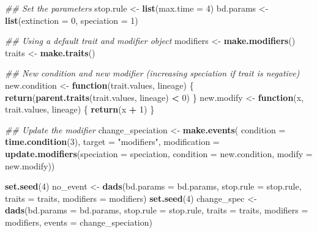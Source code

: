 \documentclass[]{book}
\newenvironment{Shaded}{\begin{snugshade}}{\end{snugshade}}
\newcommand{\CommentTok}[1]{\textcolor[rgb]{0.56,0.35,0.01}{\textit{#1}}}
\newcommand{\ControlFlowTok}[1]{\textcolor[rgb]{0.13,0.29,0.53}{\textbf{#1}}}
\newcommand{\DataTypeTok}[1]{\textcolor[rgb]{0.13,0.29,0.53}{#1}}
\newcommand{\DecValTok}[1]{\textcolor[rgb]{0.00,0.00,0.81}{#1}}
\newcommand{\KeywordTok}[1]{\textcolor[rgb]{0.13,0.29,0.53}{\textbf{#1}}}
\newcommand{\NormalTok}[1]{#1}
\newcommand{\OperatorTok}[1]{\textcolor[rgb]{0.81,0.36,0.00}{\textbf{#1}}}
\newcommand{\StringTok}[1]{\textcolor[rgb]{0.31,0.60,0.02}{#1}}
\begin{document}
\begin{Shaded}
\begin{Highlighting}[]
\CommentTok{## Set the parameters}
\NormalTok{stop.rule <-}\StringTok{ }\KeywordTok{list}\NormalTok{(}\DataTypeTok{max.time =} \DecValTok{4}\NormalTok{)}
\NormalTok{bd.params <-}\StringTok{ }\KeywordTok{list}\NormalTok{(}\DataTypeTok{extinction =} \DecValTok{0}\NormalTok{, }\DataTypeTok{speciation =} \DecValTok{1}\NormalTok{)}

\CommentTok{## Using a default trait and modifier object}
\NormalTok{modifiers <-}\StringTok{ }\KeywordTok{make.modifiers}\NormalTok{()}
\NormalTok{traits <-}\StringTok{ }\KeywordTok{make.traits}\NormalTok{()}

\CommentTok{## New condition and new modifier (increasing speciation if trait is negative)}
\NormalTok{new.condition <-}\StringTok{ }\ControlFlowTok{function}\NormalTok{(trait.values, lineage) \{}
    \KeywordTok{return}\NormalTok{(}\KeywordTok{parent.traits}\NormalTok{(trait.values, lineage) }\OperatorTok{<}\StringTok{ }\DecValTok{0}\NormalTok{)}
\NormalTok{\}}
\NormalTok{new.modify    <-}\StringTok{ }\ControlFlowTok{function}\NormalTok{(x, trait.values, lineage) \{}
  \KeywordTok{return}\NormalTok{(x }\OperatorTok{+}\StringTok{ }\DecValTok{1}\NormalTok{)}
\NormalTok{\}}

\CommentTok{## Update the modifier}
\NormalTok{change_speciation <-}\StringTok{ }\KeywordTok{make.events}\NormalTok{(}
    \DataTypeTok{condition    =} \KeywordTok{time.condition}\NormalTok{(}\DecValTok{3}\NormalTok{),}
    \DataTypeTok{target       =} \StringTok{"modifiers"}\NormalTok{,}
    \DataTypeTok{modification =} \KeywordTok{update.modifiers}\NormalTok{(}\DataTypeTok{speciation =}\NormalTok{ speciation,}
                                    \DataTypeTok{condition  =}\NormalTok{ new.condition,}
                                    \DataTypeTok{modify     =}\NormalTok{ new.modify))}

\KeywordTok{set.seed}\NormalTok{(}\DecValTok{4}\NormalTok{)}
\NormalTok{no_event <-}\StringTok{ }\KeywordTok{dads}\NormalTok{(}\DataTypeTok{bd.params =}\NormalTok{ bd.params,}
                 \DataTypeTok{stop.rule =}\NormalTok{ stop.rule,}
                 \DataTypeTok{traits    =}\NormalTok{ traits,}
                 \DataTypeTok{modifiers =}\NormalTok{ modifiers)}
\KeywordTok{set.seed}\NormalTok{(}\DecValTok{4}\NormalTok{)}
\NormalTok{change_spec <-}\StringTok{ }\KeywordTok{dads}\NormalTok{(}\DataTypeTok{bd.params =}\NormalTok{ bd.params,}
                    \DataTypeTok{stop.rule =}\NormalTok{ stop.rule,}
                    \DataTypeTok{traits    =}\NormalTok{ traits,}
                    \DataTypeTok{modifiers =}\NormalTok{ modifiers,}
                    \DataTypeTok{events    =}\NormalTok{ change_speciation)}


\end{Highlighting}
\end{Shaded}
\end{document}
